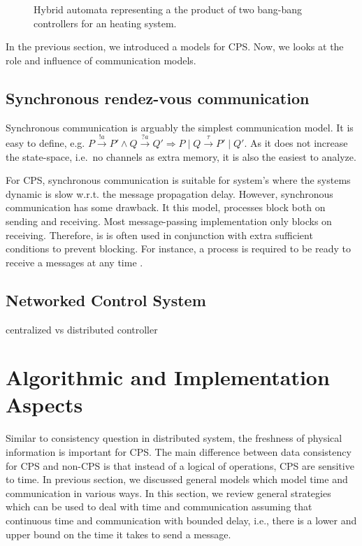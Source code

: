\documentclass[
graybox,
envcountchap
]{svmult}
\begin{document}
\begin{bibunit}
\begin{figure}
\centering

\caption{
    Hybrid automata representing a the product of two bang-bang controllers for an heating system.
}
\label{fig:HA-ex2}
\end{figure}

In the previous section, we introduced a models for CPS.
Now, we looks at the role and influence of communication models.

    \subsection{Synchronous rendez-vous communication}

Synchronous communication is arguably the simplest communication model.
It is easy to define, e.g. $P \stackrel{!a}{\rightarrow} P' \land Q \stackrel{?a}{\rightarrow} Q' \Rightarrow P \mid Q \stackrel{\tau}{\rightarrow} P' \mid Q'$.
As it does not increase the state-space, i.e.~no channels as extra memory, it is also the easiest to analyze.

For CPS, synchronous communication is suitable for system's where the systems dynamic is slow w.r.t. the message propagation delay.
However, synchronous communication has some drawback.
It this model, processes block both on sending and receiving.
Most message-passing implementation only blocks on receiving.
Therefore, is is often used in conjunction with extra sufficient conditions to prevent blocking.
For instance, a process is required to be ready to receive a messages at any time \cite{?}. 



    \subsection{Networked Control System}

    centralized vs distributed controller

\section{Algorithmic and Implementation Aspects}

    Similar to consistency question in distributed system, the freshness of physical information is important for CPS.
    The main difference between data consistency for CPS and non-CPS is that instead of a logical of operations, CPS are sensitive to time.
    In previous section, we discussed general models which model time and communication in various ways.
    In this section, we review general strategies which can be used to deal with time and communication assuming that continuous time and communication with bounded delay, i.e., there is a lower and upper bound on the time it takes to send a message.


\end{bibunit}
\end{document}
